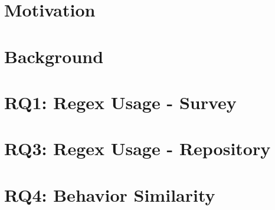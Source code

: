 \section{Motivation}




\section{Background}



\section{RQ1: Regex Usage - Survey}



\section{RQ3: Regex Usage - Repository}




\section{RQ4: Behavior Similarity}


